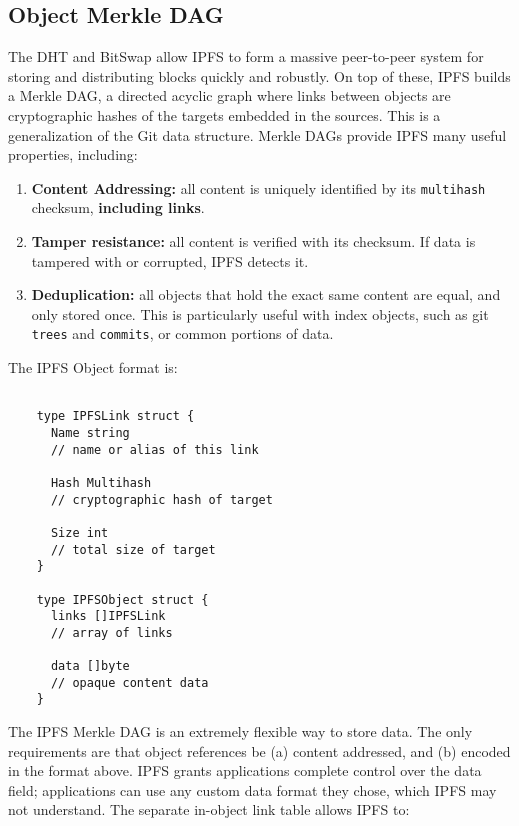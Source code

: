 \documentclass{sig-alternate}
\begin{document}
\subsection{Object Merkle DAG}

The DHT and BitSwap allow IPFS to form a massive peer-to-peer system for storing and distributing blocks quickly and robustly. On top of these, IPFS builds a Merkle DAG, a directed acyclic graph where links between objects are cryptographic hashes of the targets embedded in the sources. This is a generalization of the Git data structure. Merkle DAGs provide IPFS many useful properties, including:

\begin{enumerate}
  \item \textbf{Content Addressing:} all content is uniquely identified by its
        \texttt{multihash} checksum, \textbf{including links}.
  \item \textbf{Tamper resistance:} all content is verified with its checksum.
        If data is tampered with or corrupted, IPFS detects it.
  \item \textbf{Deduplication:} all objects that hold the exact same content
        are equal, and only stored once. This is particularly useful with
        index objects, such as git \texttt{trees} and \texttt{commits}, or common portions of data.
\end{enumerate}

The IPFS Object format is:

\begin{verbatim}

    type IPFSLink struct {
      Name string
      // name or alias of this link

      Hash Multihash
      // cryptographic hash of target

      Size int
      // total size of target
    }

    type IPFSObject struct {
      links []IPFSLink
      // array of links

      data []byte
      // opaque content data
    }

\end{verbatim}


The IPFS Merkle DAG is an extremely flexible way to store data. The only requirements are that object references be (a) content addressed, and (b) encoded in the format above. IPFS grants applications complete control over the data field; applications can use any custom data format they chose, which IPFS may not understand. The separate in-object link table allows IPFS to:
\end{document}
